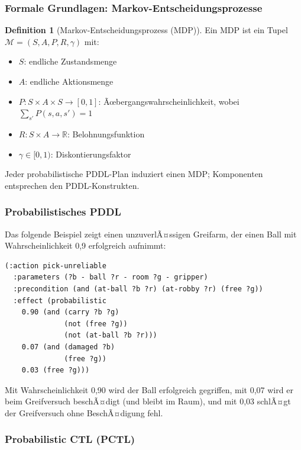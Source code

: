 ﻿\documentclass[a4paper,12pt]{article}
\theoremstyle{definition}
\newtheorem{definition}{Definition}[section]
\begin{document}
\subsubsection{Formale Grundlagen: Markov-Entscheidungsprozesse}

\begin{definition}[Markov-Entscheidungsprozess (MDP)]
Ein MDP ist ein Tupel $\mathcal{M} = (S, A, P, R, \gamma)$ mit:
\begin{itemize}
  \item[-] $S$: endliche Zustandsmenge
  \item[-] $A$: endliche Aktionsmenge
  \item[-] $P: S \times A \times S \to [0,1]$: Ãœbergangswahrscheinlichkeit, wobei $\sum_{s'} P(s,a,s') = 1$
  \item[-] $R: S \times A \to \mathbb{R}$: Belohnungsfunktion
  \item[-] $\gamma \in [0,1)$: Diskontierungsfaktor
\end{itemize}
\end{definition}

Jeder probabilistische PDDL-Plan induziert
einen MDP; Komponenten entsprechen den PDDL-Konstrukten.

\subsubsection{Probabilistisches PDDL}

Das folgende Beispiel zeigt einen unzuverlÃ¤ssigen Greifarm, der einen Ball mit Wahrscheinlichkeit 0,9 erfolgreich aufnimmt:

\begin{lstlisting}[language=PDDL, caption=Probabilistischer PDDL-Operator]
(:action pick-unreliable
  :parameters (?b - ball ?r - room ?g - gripper)
  :precondition (and (at-ball ?b ?r) (at-robby ?r) (free ?g))
  :effect (probabilistic
    0.90 (and (carry ?b ?g)
              (not (free ?g))
              (not (at-ball ?b ?r)))
    0.07 (and (damaged ?b)
              (free ?g))
    0.03 (free ?g)))
\end{lstlisting}

Mit Wahrscheinlichkeit 0,90 wird der Ball erfolgreich gegriffen, mit 0,07 wird er beim Greifversuch beschÃ¤digt (und bleibt im Raum), und mit 0,03 schlÃ¤gt der Greifversuch ohne BeschÃ¤digung fehl.

\subsubsection{Probabilistic CTL (PCTL)}
\end{document}
